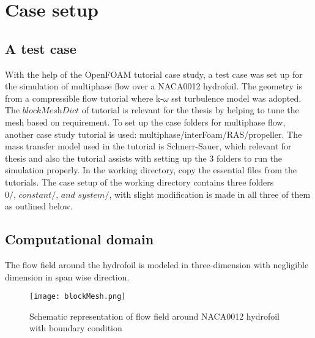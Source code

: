 \chapter{Case setup}
\section{A test case}
With the help of the OpenFOAM tutorial case study, a test case was set up
for the simulation of multiphase flow over a NACA0012 hydrofoil. The geometry is from a compressible flow tutorial 
where  k-$\omega$ sst turbulence model was adopted. The $\textit{blockMeshDict}$ of tutorial is relevant for the thesis by helping 
to tune the mesh based on requirement. To set up the case folders for multiphase flow, another case study 
tutorial is used: multiphase/interFoam/RAS/propeller. The mass transfer model used in the tutorial is 
Schnerr-Sauer, which relevant for  thesis and also the tutorial assists with setting up 
the 3 folders to run the simulation properly. In the working directory, copy the essential 
files from the tutorials. The case setup of the working directory contains three folders 
$\textit {0/, constant/, and system/}$, with slight modification is made in all three 
of them as outlined below.
\section{Computational domain}
The flow field around the hydrofoil is modeled in three-dimension with negligible 
dimension in span wise direction. 
\begin{figure}[H]
    \centering
    \texttt{[image: blockMesh.png]}
    \caption{Schematic representation of flow field around NACA0012 hydrofoil with boundary condition}
    \label{fig:fig16}
\end{figure}
